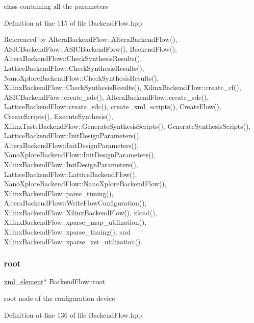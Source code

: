 class containing all the parameters 



Definition at line 115 of file Backend\+Flow.\+hpp.



Referenced by Altera\+Backend\+Flow\+::\+Altera\+Backend\+Flow(), A\+S\+I\+C\+Backend\+Flow\+::\+A\+S\+I\+C\+Backend\+Flow(), Backend\+Flow(), Altera\+Backend\+Flow\+::\+Check\+Synthesis\+Results(), Lattice\+Backend\+Flow\+::\+Check\+Synthesis\+Results(), Nano\+Xplore\+Backend\+Flow\+::\+Check\+Synthesis\+Results(), Xilinx\+Backend\+Flow\+::\+Check\+Synthesis\+Results(), Xilinx\+Backend\+Flow\+::create\+\_\+cf(), A\+S\+I\+C\+Backend\+Flow\+::create\+\_\+sdc(), Altera\+Backend\+Flow\+::create\+\_\+sdc(), Lattice\+Backend\+Flow\+::create\+\_\+sdc(), create\+\_\+xml\+\_\+scripts(), Create\+Flow(), Create\+Scripts(), Execute\+Synthesis(), Xilinx\+Taste\+Backend\+Flow\+::\+Generate\+Synthesis\+Scripts(), Generate\+Synthesis\+Scripts(), Lattice\+Backend\+Flow\+::\+Init\+Design\+Parameters(), Altera\+Backend\+Flow\+::\+Init\+Design\+Parameters(), Nano\+Xplore\+Backend\+Flow\+::\+Init\+Design\+Parameters(), Xilinx\+Backend\+Flow\+::\+Init\+Design\+Parameters(), Lattice\+Backend\+Flow\+::\+Lattice\+Backend\+Flow(), Nano\+Xplore\+Backend\+Flow\+::\+Nano\+Xplore\+Backend\+Flow(), Xilinx\+Backend\+Flow\+::parse\+\_\+timing(), Altera\+Backend\+Flow\+::\+Write\+Flow\+Configuration(), Xilinx\+Backend\+Flow\+::\+Xilinx\+Backend\+Flow(), xload(), Xilinx\+Backend\+Flow\+::xparse\+\_\+map\+\_\+utilization(), Xilinx\+Backend\+Flow\+::xparse\+\_\+timing(), and Xilinx\+Backend\+Flow\+::xparse\+\_\+xst\+\_\+utilization().

\mbox{\label{classBackendFlow_aab524f20d7d689fd52c38402c06b0f91}} 
\subsubsection{\texorpdfstring{root}{root}}
{\footnotesize\ttfamily \hyperlink{classxml__element}{xml\+\_\+element}$\ast$ Backend\+Flow\+::root\hspace{0.3cm}{\ttfamily [protected]}}



root node of the configuration device 



Definition at line 136 of file Backend\+Flow.\+hpp.



